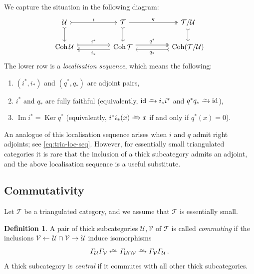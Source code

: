 \documentclass{amsart}[a4]
\newtheorem{lemma}[theorem]{Lemma}
\theoremstyle{definition}
\newtheorem{definition}[theorem]{Definition}
\theoremstyle{remark}
\numberwithin{equation}{section}
\newcommand{\Coh}{\operatorname{Coh}}
\renewcommand{\Im}{\operatorname{Im}}
\newcommand{\Ker}{\operatorname{Ker}}
\newcommand{\iso}{\xrightarrow{\raisebox{-.6ex}[0ex][0ex]{$\scriptstyle{\sim}$}}}
\newcommand{\leftiso}{\xleftarrow{\raisebox{-.6ex}[0ex][0ex]{$\scriptstyle{\sim}$}}}
\newcommand{\id}{\mathrm{id}}
\newcommand{\cat}{\mathcal}
\let\Gamma\varGamma
\begin{document}
We capture the situation in the following diagram: 
\begin{equation*}
  \begin{tikzcd}
\cat U \arrow[tail]{d}\arrow[tail,"i"]{rr} &&\cat T  \arrow[tail]{d} \arrow[twoheadrightarrow,"q"]{rr}&&\cat T/\cat U \arrow[tail]{d}\\
\Coh\cat U \arrow[tail,yshift=0.75ex]{rr}{i^*} &&\Coh\cat T  \arrow[twoheadrightarrow,yshift=-0.75ex]{ll}{i_*}
\arrow[twoheadrightarrow,yshift=0.75ex]{rr}{q^*} &&\Coh(\cat T/\cat U) \arrow[tail,yshift=-0.75ex]{ll}{q_*}
\end{tikzcd}
\end{equation*}
The lower row is a \emph{localisation sequence}, which means the following:
\begin{enumerate}
\item[(L1)] $(i^*,i_*)$ and $(q^*,q_*)$ are adjoint pairs,
\item[(L2)] $i^*$ and $q_*$ are fully faithful (equivalently,
  $\id\iso i_*i^*$ and $q^*q_*\iso\id$),
\item[(L3)] $\Im i^*=\Ker q^*$ (equivalently, $i^*i_*(x)\iso x$ if and only if $q^*(x)=0$).
\end{enumerate}
An analogue of this localisation sequence arises when $i$ and $q$ admit right
adjoints; see \eqref{eq:tria-loc-seq}. However, for
essentially small triangulated categories it is rare that the
inclusion of a thick subcategory admits an adjoint, and the
above localisation sequence is a useful substitute.

\subsection*{Commutativity}

Let $\cat T$ be a triangulated category, and we assume that $\cat T$ is essentially small. 

\begin{definition}
  A pair of thick subcategories
  $\cat U,\cat V$ of $\cat T$ is called \emph{commuting} if the inclusions
  $\cat V\leftarrow \cat U\cap\cat V\to\cat U$ induce isomorphisms
\[\Gamma_{\cat U}\Gamma_{\cat V}\leftiso\Gamma_{\cat U\cap\cat
    V}\iso \Gamma_{\cat V}\Gamma_{\cat U}\,.\] 
A thick subcategory is \emph{central} if it commutes with all other
thick subcategories.
\end{definition}
\end{document}
